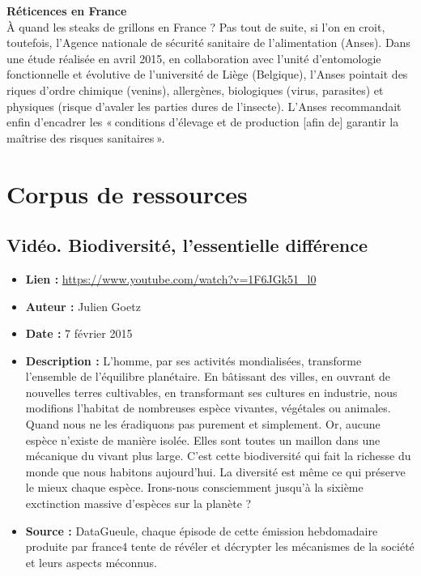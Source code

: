 \documentclass[8pt]{article}
\begin{document}
\textbf{Réticences en France}\\

À quand les steaks de grillons en France ? Pas tout de suite, si l'on en croit, toutefois, l'Agence nationale de sécurité sanitaire de l’alimentation (Anses). Dans une étude réalisée en avril 2015, en collaboration avec l’unité d’entomologie fonctionnelle et évolutive de l’université de Liège (Belgique), l’Anses pointait des riques d’ordre chimique (venins), allergènes, biologiques (virus, parasites) et physiques (risque d’avaler les parties dures de l’insecte). L’Anses recommandait enfin d’encadrer les « conditions d’élevage et de production [afin de] garantir la maîtrise des risques sanitaires ».

\newpage
\section{Corpus de ressources}
\subsection{Vidéo. Biodiversité, l'essentielle différence}

\begin{itemize}
	\item \textbf{Lien : }  \url{https://www.youtube.com/watch?v=1F6JGk51_l0} 
	\item \textbf{Auteur : } Julien Goetz
	\item \textbf{Date : } 7 février 2015
	\item \textbf{Description : } L'homme, par ses activités mondialisées, transforme l'ensemble de l'équilibre planétaire. En bâtissant des villes, en ouvrant de nouvelles terres cultivables, en transformant ses cultures en industrie, nous modifions l'habitat de nombreuses espèce vivantes, végétales ou animales. Quand nous ne les éradiquons pas purement et simplement. Or, aucune espèce n'existe de manière isolée. Elles sont toutes un maillon dans une mécanique du vivant plus large. C'est cette biodiversité qui fait la richesse du monde que nous habitons aujourd'hui. La diversité est même ce qui préserve le mieux chaque espèce. Irons-nous consciemment jusqu'à la sixième exctinction massive d'espèces sur la planète ?
	\item \textbf{Source : } DataGueule, chaque épisode de cette émission hebdomadaire produite par france4 tente de révéler et décrypter les mécanismes de la société et leurs aspects méconnus.
\end{itemize}
\end{document}
